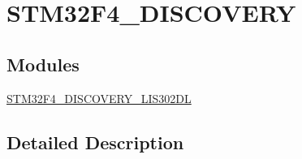 \hypertarget{group___s_t_m32_f4___d_i_s_c_o_v_e_r_y}{\section{S\-T\-M32\-F4\-\_\-\-D\-I\-S\-C\-O\-V\-E\-R\-Y}
\label{group___s_t_m32_f4___d_i_s_c_o_v_e_r_y}
}
\subsection*{Modules}
\begin{DoxyCompactItemize}
\item 
\hyperlink{group___s_t_m32_f4___d_i_s_c_o_v_e_r_y___l_i_s302_d_l}{S\-T\-M32\-F4\-\_\-\-D\-I\-S\-C\-O\-V\-E\-R\-Y\-\_\-\-L\-I\-S302\-D\-L}
\end{DoxyCompactItemize}


\subsection{Detailed Description}
